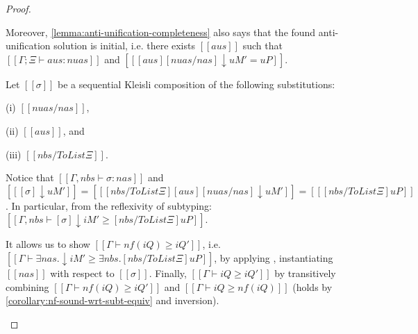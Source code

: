 \begin{proof}
\begin{caseof}
    Moreover, \cref{lemma:anti-unification-completeness} also says that the found anti-unification 
    solution is initial, i.e. there exists $[[aus]]$ such that
     $[[Γ;Ξ ⊢ aus :{nuas}]]$ and $[[ [aus][nuas/nas]↓uM' = uP ]]$.

     Let $[[σ]]$ be a sequential Kleisli composition of the following
     substitutions:
     \begin{enumerate*}
     \item[(i)] $[[nuas/nas]]$,
     \item[(ii)] $[[aus]]$, and
     \item[(iii)] $[[nbs / ToList Ξ]]$.
     \end{enumerate*}
     Notice that $[[Γ, nbs ⊢ σ :{nas}]]$
     and $[[ [σ]↓uM' ]] = [[ [nbs / ToList Ξ][aus][nuas/nas]↓uM' ]] = [[ [nbs /
     ToList Ξ]uP ]]$. In particular, from the reflexivity of subtyping:
     $[[Γ, nbs ⊢ [σ]↓iM' ≥ [nbs / ToList Ξ]uP]]$.

     It allows us to show $[[Γ ⊢ nf(iQ) ≥ iQ']]$, i.e. $[[Γ ⊢ ∃nas.↓iM' ≥
     ∃nbs.[nbs / ToList Ξ]uP]]$, by applying ,
     instantiating $[[nas]]$ with respect to $[[σ]]$. Finally, $[[Γ ⊢ iQ ≥ iQ']]$
     by transitively combining $[[Γ ⊢ nf(iQ) ≥ iQ']]$ and $[[Γ ⊢ iQ ≥ nf(iQ)]]$ 
     (holds by \cref{corollary:nf-sound-wrt-subt-equiv} and inversion).
  \end{caseof}
\end{proof}
